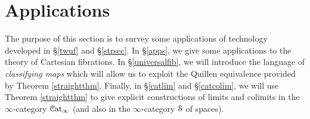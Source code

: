 
\section{Applications}\label{hugr}
\setcounter{theorem}{0}

The purpose of this section is to survey some applications of technology developed in
\S \ref{twuf} and \S \ref{strsec}. 
In \S \ref{apps}, we give some applications to the theory of Cartesian fibrations. In \S \ref{universalfib}, we will introduce the language of {\it classifying maps} which will allow us to exploit the Quillen equivalence provided by Theorem \ref{straightthm}. Finally, in \S \ref{catlim} and \S \ref{catcolim}, we will use Theorem \ref{straightthm} to give explicit constructions of limits and colimits in the $\infty$-category $\operatorname{\mathcal{C}at}_{\infty}$ (and also in the $\infty$-category $\operatorname{\mathcal{S}}$ of spaces).




